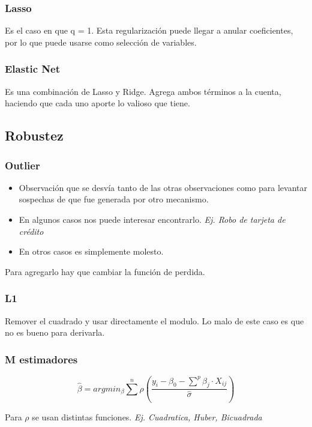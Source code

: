 \documentclass[titlepage,a4paper]{article}
\begin{document}
\subsubsection{Lasso}
Es el caso en que q = 1. Esta regularización puede llegar a anular coeficientes, por lo que puede usarse como selección de variables.

\subsubsection{Elastic Net}
Es una combinación de Lasso y Ridge. Agrega ambos términos a la cuenta, haciendo que cada uno aporte lo valioso que tiene.

\subsection{Robustez}
\subsubsection*{Outlier}
\begin{itemize}
    \item Observación que se desvía tanto de las otras observaciones como para levantar sospechas de que fue generada por otro mecanismo.
    \item En algunos casos nos puede interesar encontrarlo. \textit{Ej. Robo de tarjeta de crédito}
    \item En otros casos es simplemente molesto.
\end{itemize}


Para agregarlo hay que cambiar la función de perdida.

\subsubsection{L1}
Remover el cuadrado y usar directamente el modulo. Lo malo de este caso es que no es bueno para derivarla.

\subsubsection{M estimadores}
\begin{equation}
    \hat{\beta} = arg min_\beta \sum^{n} \rho(\frac{ y_{i}-\beta_0-\sum^{p}\beta_j \cdot X_{ij}}{\hat{\sigma}})
\end{equation}

Para $\rho$ se usan distintas funciones. \textit{Ej. Cuadratica, Huber, Bicuadrada}
\end{document}
